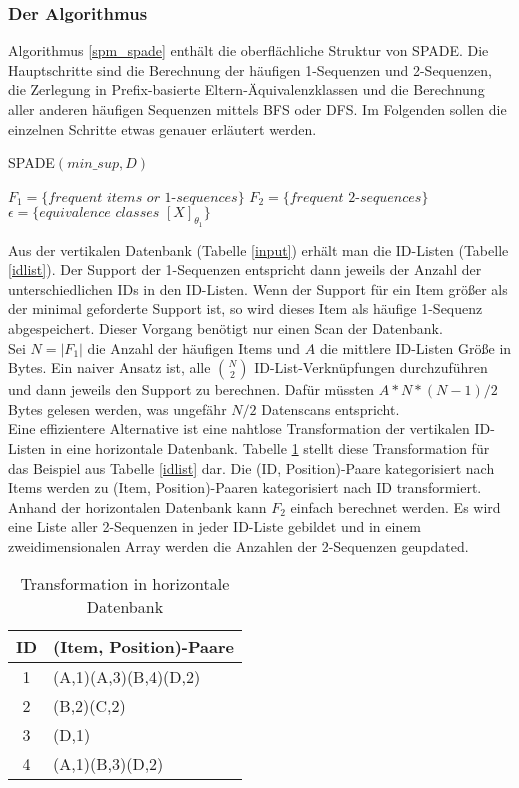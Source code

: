 \subsubsection*{Der Algorithmus}
Algorithmus \ref{spm_spade} enthält die oberflächliche Struktur von SPADE. Die Hauptschritte sind die Berechnung der häufigen 1-Sequenzen und 2-Sequenzen, die Zerlegung in Prefix-basierte Eltern-Äquivalenzklassen und die Berechnung aller anderen häufigen Sequenzen mittels BFS oder DFS. Im Folgenden sollen die einzelnen Schritte etwas genauer erläutert werden.\\
\begin{algorithm}
\caption{SPADE$(min\_ sup,D)$}\label{spm_spade}
\label{spadealg}
\begin{algorithmic}
\STATE $F_1 = \{ \textit{frequent items or 1-sequences} \}$
\STATE $F_2 = \{ \textit{frequent 2-sequences} \}$
\STATE $\epsilon = \{ \textit{equivalence classes } [X]_{\theta_1} \}$
  \ENDFOR
\end{algorithmic}
\end{algorithm}
Aus der vertikalen Datenbank (Tabelle \ref{input}) erhält man die ID-Listen (Tabelle \ref{idlist}). Der Support der 1-Sequenzen entspricht dann
jeweils der Anzahl der unterschiedlichen IDs in den ID-Listen. Wenn der Support für ein Item größer als der minimal geforderte Support ist, so wird dieses Item als häufige 1-Sequenz abgespeichert. Dieser Vorgang benötigt nur einen Scan der Datenbank.\\
Sei $N=|F_1|$ die Anzahl der häufigen Items und $A$ die mittlere ID-Listen Größe in Bytes. Ein naiver Ansatz ist, alle $\binom{N}{2}$ ID-List-Verknüpfungen durchzuführen und dann jeweils den Support zu berechnen. Dafür müssten $A*N*(N-1)/2$ Bytes gelesen werden, was ungefähr $N/2$ Datenscans entspricht.\\
Eine effizientere Alternative ist eine nahtlose Transformation der vertikalen ID-Listen in eine horizontale Datenbank. Tabelle \ref{hor} stellt diese Transformation für das Beispiel aus Tabelle \ref{idlist} dar. Die (ID, Position)-Paare kategorisiert nach Items werden zu (Item, Position)-Paaren kategorisiert nach ID transformiert. Anhand der horizontalen Datenbank kann $F_2$ einfach berechnet werden. Es wird eine Liste aller 2-Sequenzen in jeder ID-Liste gebildet und in einem zweidimensionalen Array werden die Anzahlen der 2-Sequenzen geupdated.\\
\begin{table}[hbt]
\centering
\begin{tabular}{c|l}
ID & (Item, Position)-Paare \\ \hline
1  & (A,1)(A,3)(B,4)(D,2) \\
2  & (B,2)(C,2) \\
3  & (D,1) \\
4  & (A,1)(B,3)(D,2)
\end{tabular}
\caption{Transformation in horizontale Datenbank}\label{hor}
\end{table}
